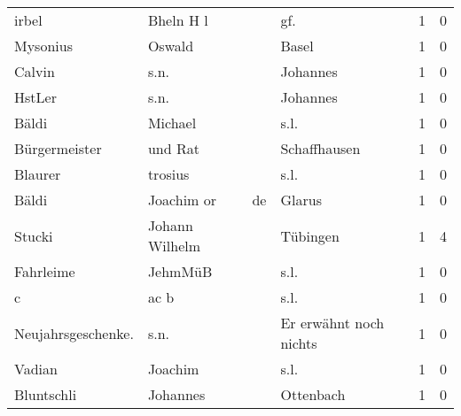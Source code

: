 \begin{tabular}{llllrr}
                    irbel &                          Bheln H l &             &                                        gf.  &          1 &         0 \\
                 Mysonius &                             Oswald &             &                                       Basel &          1 &         0 \\
                   Calvin &                               s.n. &             &                                    Johannes &          1 &         0 \\
                   HstLer &                               s.n. &             &                                    Johannes &          1 &         0 \\
                    Bäldi &                            Michael &             &                                        s.l. &          1 &         0 \\
            Bürgermeister &                            und Rat &             &                                Schaffhausen &          1 &         0 \\
                  Blaurer &                            trosius &             &                                        s.l. &          1 &         0 \\
                    Bäldi &                         Joachim or &          de &                                      Glarus &          1 &         0 \\
                   Stucki &                     Johann Wilhelm &             &                                    Tübingen &          1 &         4 \\
                Fahrleime &                            JehmMüB &             &                                        s.l. &          1 &         0 \\
                        c &                               ac b &             &                                        s.l. &          1 &         0 \\
       Neujahrsgeschenke. &                               s.n. &             &                      Er erwähnt noch nichts &          1 &         0 \\
                   Vadian &                            Joachim &             &                                        s.l. &          1 &         0 \\
               Bluntschli &                           Johannes &             &                                   Ottenbach &          1 &         0 \\

\end{tabular}
